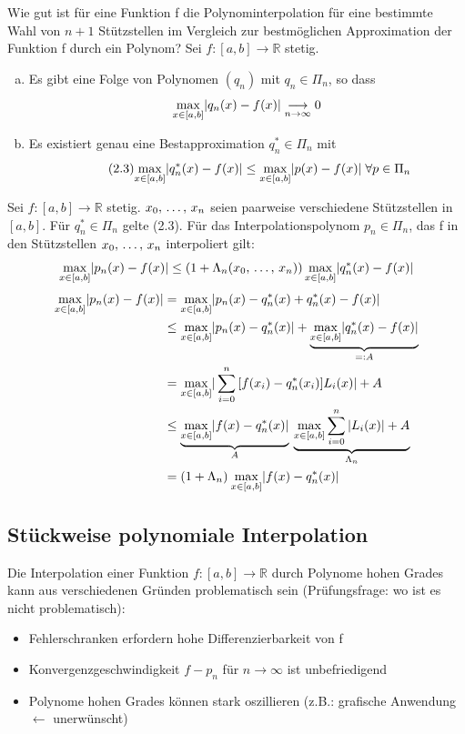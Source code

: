 Wie gut ist für eine Funktion f die Polynominterpolation für eine bestimmte Wahl
von $n + 1$ Stützstellen im Vergleich zur bestmöglichen Approximation der Funktion f
durch ein Polynom?
 Sei $f:[a, b] \longrightarrow \mathbb{R}$ stetig.
\begin{enumerate}[(a)]
  \item Es gibt eine Folge von Polynomen $(q_n)$ mit $q_n \in \Pi_n$, so dass
    \begin{equation*}
      \underset{x \in [a, b]}{\max} |q_n(x) - f(x)| \underset{n \to \infty}{\longrightarrow} 0
    \end{equation*}
  \item Es existiert genau eine Bestapproximation $q_n^* \in \Pi_n$ mit
    \begin{equation}
      \tag{2.3}
      \underset{x \in [a, b]}{\max} |q_n^*(x) - f(x)| \leq \underset{x \in [a, b]}{\max} |p(x) - f(x)| \; \forall p \in \Pi_n
    \end{equation}
\end{enumerate}
 Sei $f:[a, b] \longrightarrow \mathbb{R}$ stetig. $x_0,\,\ldots,\,x_n$
seien paarweise verschiedene Stützstellen in $[a, b]$. Für $q_n^* \in \Pi_n$ gelte
(2.3). Für das Interpolationspolynom $p_n \in \Pi_n$, das f in den Stützstellen
$x_0,\,\ldots,\,x_n$ interpoliert gilt:
\begin{equation*}
  \underset{x \in [a, b]}{\max} |p_n(x) - f(x)| \leq (1 + \Lambda_n(x_0,\,\ldots,\,x_n))\,\underset{x \in [a, b]}{\max} |q_n^*(x) - f(x)|
\end{equation*}
\begin{align*}
  \underset{x \in [a, b]}{\max} |p_n(x) - f(x)| &= \underset{x \in [a, b]}{\max} |p_n(x) - q_n^*(x) + q_n^*(x) - f(x)|\\
  &\leq \underset{x \in [a, b]}{\max} |p_n(x) - q_n^*(x)| + \underbrace{\underset{x \in [a, b]}{\max} |q_n^*(x) - f(x)|}_{=:A}\\
  &= \underset{x \in [a, b]}{\max} |\sum\limits_{i=0}^{n}{[}f(x_i) - q_n^*(x_i)]L_i(x)| + A\\
  &\leq \underbrace{\underset{x \in [a, b]}{\max} |f(x) - q_n^*(x)|}_A \: \underbrace{\underset{x \in [a, b]}{\max} \sum\limits_{i=0}^{n}{|}L_i(x)| + A}_{\Lambda_n}\\
  &= (1 + \Lambda_n) \: \underset{x \in [a, b]}{\max} |f(x) - q_n^*(x)|
\end{align*}

\subsection{Stückweise polynomiale Interpolation}
Die Interpolation einer Funktion $f:[a,b] \longrightarrow \mathbb{R}$ durch Polynome hohen Grades
kann aus verschiedenen Gründen problematisch sein (Prüfungsfrage: wo ist es nicht problematisch):
\begin{itemize}
  \item Fehlerschranken erfordern hohe Differenzierbarkeit von f
  \item Konvergenzgeschwindigkeit $f-p_n$ für $n \rightarrow \infty$ ist unbefriedigend
  \item Polynome hohen Grades können stark oszillieren (z.B.: grafische Anwendung $\leftarrow$ unerwünscht)
\end{itemize}

